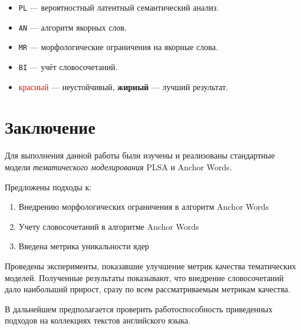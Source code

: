 \documentclass[a4paper, 14pt]{extarticle}
\begin{document}
	\begin{itemize}
		\item {\tt PL} --- вероятностный латентный семантический анализ.
		\item {\tt AN} --- алгоритм якорных слов.
		\item {\tt MR} --- морфологические ограничения на якорные слова.
		\item {\tt BI} --- учёт словосочетаний.
		\item \textcolor{red}{красный} --- неустойчивый, \textbf{жирный} --- лучший результат.
	\end{itemize}


\newpage

\section*{Заключение}

Для выполнения данной работы были изучены и реализованы стандартные модели \emph{тематического моделирования} PLSA и Anchor Words. 

\noindent Предложены подходы к:
\begin{enumerate}
	\item Внедрению морфологических ограничения в алгоритм Anchor Words 
	\item Учету словосочетаний в алгоритме Anchor Words 
	\item Введена метрика уникальности ядер
\end{enumerate}

\noindent Проведены эксперименты, показавшие улучшение метрик качества тематических моделей.
Полученные результаты показывают, что внедрение словосочетаний дало наибольший прирост, сразу по всем рассматриваемым метрикам качества.

В дальнейшем предполагается проверить работоспособность приведенных подходов на коллекциях текстов английского языка. 

\newpage


\end{document}
